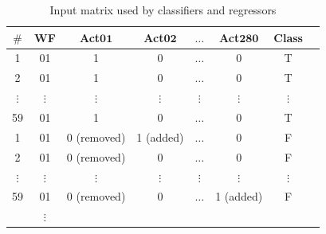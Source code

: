 \documentclass{doublecol-new}
\theoremstyle{TH}{
\newtheorem{lemma}{Lemma}
\newtheorem{theorem}[lemma]{Theorem}
\newtheorem{corrolary}[lemma]{Corrolary}
\newtheorem{conjecture}[lemma]{Conjecture}
\newtheorem{proposition}[lemma]{Proposition}
\newtheorem{claim}[lemma]{Claim}
\newtheorem{stheorem}[lemma]{Wrong Theorem}
\newtheorem{algorithm}{Algorithm}
}
\theoremstyle{THrm}{
\newtheorem{definition}{Definition}[section]
\newtheorem{question}{Question}[section]
\newtheorem{remark}{Remark}
\newtheorem{scheme}{Scheme}
}
\theoremstyle{THhit}{
\newtheorem{case}{Case}[section]
}
\begin{document}
\begin{table}[!htb]
	\tiny
	\label{tabela_matriz_de_dados_adapatada_classificacao_regressao}
	\centering
	\caption{Input matrix used by classifiers and regressors}
	\begin{tabular}{|c|c|c|c|c|c|c|c|}  \hline
		\textbf{\(\#\)} & \textbf{WF} & \textbf{Act\(\mathbf{01}\)} & \textbf{Act\(\mathbf{02}\)} & \textbf{\(\mathbf{\ldots}\)}  &  \textbf{Act\(\mathbf{280}\)} & \textbf{Class} \\ \hline
		1                 & 01            & 1                               & 0                               & \(\ldots\)                       & 0                                & T                \\ \hline
		2                 & 01            & 1                               & 0                               & \(\ldots\)                       & 0                                & T                \\ \hline
		\(\vdots\)        & \(\vdots\)    & \(\vdots\)                      & \(\vdots\)                      & \(\vdots\)                       & \(\vdots\)                       & \(\vdots\)       \\ \hline
		59                & 01            & 1                               & 0                               & \(\ldots\)                       & 0                                & T                \\ \hline
		1                 & 01            & 0 (removed)                     & 1 (added)                       & \(\ldots\)                       & 0                                & F                \\ \hline
		2                 & 01            & 0 (removed)                     & 0                               & \(\ldots\)                       & 0                                & F                \\ \hline
		\(\vdots\)        & \(\vdots\)    & \(\vdots\)                      & \(\vdots\)                      & \(\vdots\)                       & \(\vdots\)                       & \(\vdots\)       \\ \hline
		59                & 01            & 0 (removed)                     & 0                               & \(\ldots\)                       & 1 (added)                        & F                \\ \hline
		& \(\vdots\)    &                                 &                                 &                                  &                                  &                  \\ \hline

\end{tabular}
\end{table}
\end{document}
